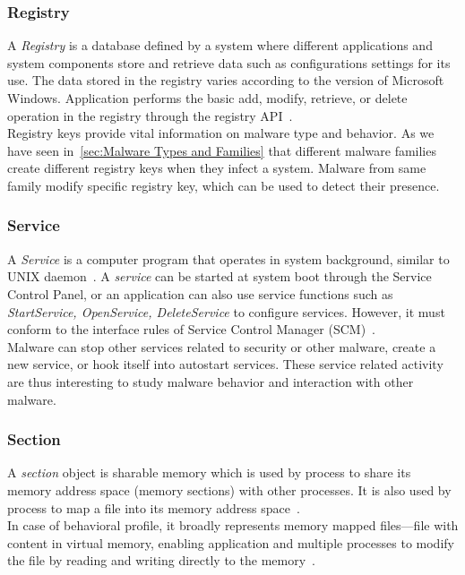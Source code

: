 \subsubsection{Registry}
\label{ssub:Registry}
A \emph{Registry} is a database defined by a system where different applications and system components store and retrieve data such as configurations settings for its use.
The data stored in the registry varies according to the version of Microsoft Windows.
Application performs the basic add, modify, retrieve, or delete operation in the registry through the registry API~\cite[]{msregistry}.\\
Registry keys provide vital information on malware type and behavior.
As we have seen in~\autoref{sec:Malware Types and Families} that different malware families create different registry keys when they infect a system.
Malware from same family modify specific registry key, which can be used to detect their presence.
\subsubsection{Service}
\label{ssub:Service}
A \emph{Service} is a computer program that operates in system background, similar to UNIX daemon~\cite[]{servicedef}.
A \emph{service} can be started at system boot through the Service Control Panel, or an application can also use service functions such as \emph{StartService, OpenService, DeleteService} to configure services.
However, it must conform to the interface rules of Service Control Manager (SCM)~\cite[]{msservice}.\\
Malware can stop other services related to security or other malware, create a new service, or hook itself into autostart services.
These service related activity are thus interesting to study malware behavior and interaction with other malware.
\subsubsection{Section}
\label{ssub:Section}
A \emph{section} object is sharable memory which is used by process to share its memory address space (memory sections) with other processes.
It is also used by process to map a file into its memory address space~\cite[]{mssection}.\\
In case of behavioral profile, it broadly represents memory mapped files---file with content in virtual memory, enabling application and multiple processes to modify the file by reading and writing directly to the memory~\cite[]{memmapfile}.
